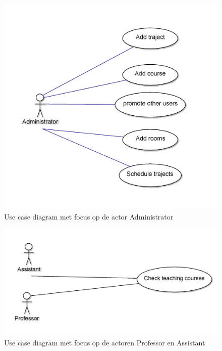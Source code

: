 \begin{figure}[H]
	\centering
	\includegraphics[scale=0.2]{img/useCaseAdmin}
	\caption{Use case diagram met focus op de actor Administrator}
	\label{fig:useCaseAdmin}
\end{figure}

\begin{figure}[H]
	\centering
	\includegraphics[scale=0.2]{img/useCaseProf}
	\caption{Use case diagram met focus op de actoren Professor en Assistant}
	\label{fig:useCaseProf}
\end{figure}


